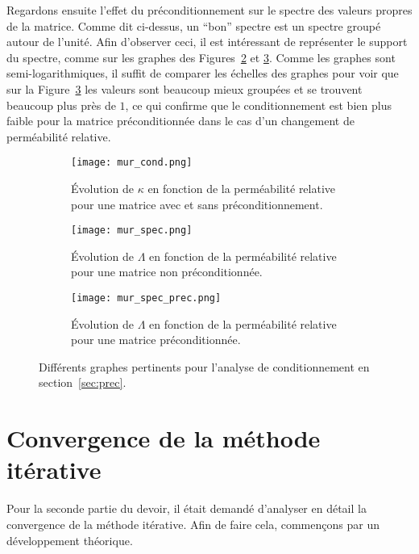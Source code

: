 \documentclass[11pt]{article}
\begin{document}
Regardons ensuite l'effet du préconditionnement sur le spectre des valeurs propres de la matrice. Comme dit ci-dessus, un \foreignquote{french}{bon} spectre est un spectre groupé autour de l'unité. Afin d'observer ceci, il est intéressant de représenter le support du spectre, comme sur les graphes des Figures~\ref{fig:mur_spec} et \ref{fig:mur_spec_prec}. Comme les graphes sont semi-logarithmiques, il suffit de comparer les échelles des graphes pour voir que sur la Figure~\ref{fig:mur_spec_prec} les valeurs sont beaucoup mieux groupées et se trouvent beaucoup plus près de $1$, ce qui confirme que le conditionnement est bien plus faible pour la matrice préconditionnée dans le cas d'un changement de perméabilité relative.

\begin{figure}[H]
	\centering
	\begin{subfigure}[t]{0.32\textwidth}
		\centering
		\texttt{[image: mur\_cond.png]}
		\caption{Évolution de $\kappa$ en fonction de la perméabilité relative pour une matrice avec et sans préconditionnement.}
		\label{fig:mur_cond}
	\end{subfigure}\hfill
	\begin{subfigure}[t]{0.32\textwidth}
		\centering
		\texttt{[image: mur\_spec.png]}
		\caption{Évolution de $\Lambda$ en fonction de la perméabilité relative pour une matrice non préconditionnée.}
		\label{fig:mur_spec}
	\end{subfigure}\hfill
	\begin{subfigure}[t]{0.32\textwidth}
		\centering
		\texttt{[image: mur\_spec\_prec.png]}
		\caption{Évolution de $\Lambda$ en fonction de la perméabilité relative pour une matrice préconditionnée.}
		\label{fig:mur_spec_prec}
	\end{subfigure}
	\caption{Différents graphes pertinents pour l'analyse de conditionnement en section~\ref{sec:prec}.}
	\label{fig:prec_effect}
\end{figure}

\section{Convergence de la méthode itérative}
\label{sec:conv}
Pour la seconde partie du devoir, il était demandé d'analyser en détail la convergence de la méthode itérative. Afin de faire cela, commençons par un développement théorique.
\end{document}
